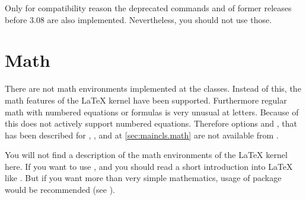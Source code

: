 Only for compatibility reason the deprecated commands  and
 of former 
releases before 3.08 are also implemented. Nevertheless, you should not use
those.%
%
%
%
%
%
%
%
%
%






\section{Math}
\label{sec:scrlttr2.math}%
%
%
%

There are not math environments implemented at the \KOMAScript{}
classes. Instead of this, the math features of the \LaTeX{} kernel have been
supported. Furthermore regular math with numbered
equations or formulas is very unusual at letters. Because of this
 does not actively support numbered equations. Therefore
options  and , that has been described for
, , and  at
\autoref{sec:maincls.math} are not available from .

You will not find a description of the math environments of the \LaTeX{} kernel
here. If you want to use ,
 and
 you should read a short introduction
into \LaTeX{} like \cite{lshort}. But if you want more than
very simple mathematics, usage of package  would be
recommended (see \cite{package:amsmath}).%
%

